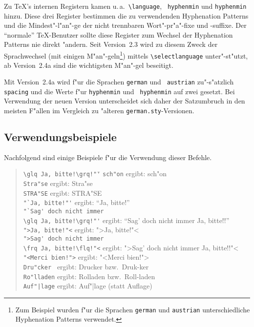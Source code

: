 Zu \TeX's internen Registern kamen u.\,a.\ \verb:\language:, {\tt
\string\left\-hyphen\-min} und {\tt \string\right\-hyphen\-min}
hinzu. Diese drei Register bestimmen die zu verwendenden
Hyphenation Patterns und die Mindest"-l"an"-ge der nicht
trennbaren Wort"-pr"a"-fixe und \mbox{-suffixe}.
Der "`normale"' \TeX-Benutzer sollte diese Register zum Wechsel
der Hyphenation Patterns nie direkt "andern.
Seit Version~2.3 wird zu diesem Zweck der Sprachwechsel
(mit einigen M"an"-geln\footnote{Zum Beispiel wurden f"ur die
Sprachen {\tt german} und {\tt austrian} unterschiedliche
Hyphenation Patterns verwendet.}) mittels \verb:\selectlanguage:
unter"-st"utzt, ab Version~2.4a sind die wichtigsten M"an"-gel
beseitigt.

Mit Version~2.4a wird f"ur die Sprachen {\tt german} und {\tt
austrian} zu"-s"atzlich {\tt \string\french\-spacing} und die Werte
f"ur {\tt \string\left\-hyphen\-min} und {\tt
\string\right\-hyphen\-min} auf zwei gesetzt.  Bei Verwendung der
neuen Version unterscheidet sich daher der Satzumbruch in den meisten
F"allen im Vergleich zu "alteren {\tt german.sty}-Versionen.


\subsection{Verwendungsbeispiele}

Nachfolgend sind einige Beispiele f"ur die Verwendung dieser
Befehle.
\begin{quote}\small
\begin{tabbing}
\verb:\glq Ja, bitte!\grq!"':\qquad \=\kill
\verb:sch"on: \> ergibt:\qquad
      sch"on \\[3pt]
\verb:Stra"se: \> ergibt:\qquad
      Stra"se \\[3pt]
\verb:STRA"SE: \> ergibt:\qquad
      STRA"SE \\[5pt]
\verb:"`Ja, bitte!"': \> ergibt:\qquad
      "`Ja, bitte!"' \\[3pt]
\verb:"`Sag' doch nicht immer:\\
\verb:\glq Ja, bitte!\grq!"': \> ergibt:\qquad
      "`Sag' doch nicht immer \glq Ja, bitte!\grq!"' \\[3pt]
\verb:">Ja, bitte!"<: \> ergibt:\qquad
      ">Ja, bitte!"< \\[3pt]
\verb:">Sag' doch nicht immer:\\
\verb:\frq Ja, bitte!\flq!"<: \> ergibt:\qquad
      ">Sag' doch nicht immer \frq Ja, bitte!\flq!"< \\[3pt]
\verb:"<Merci bien!">: \> ergibt:\qquad
      "<Merci bien!"> \\[5pt]
\verb:Dru"cker : \> ergibt:\qquad
      Drucker bzw.\ Druk-ker \\[3pt]
\verb:Ro"lladen: \> ergibt:\qquad
      Rolladen bzw.\ Roll-laden \\[3pt]
\verb:Auf"|lage: \> ergibt:\qquad
      Auf"|lage (statt Auflage)
\end{tabbing}
\end{quote}


